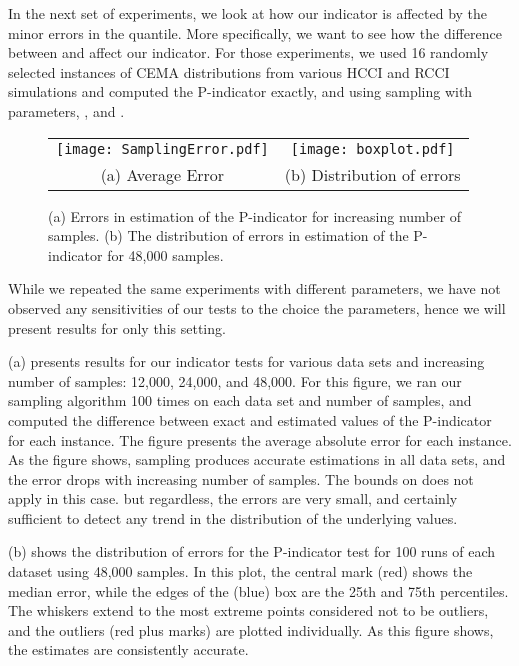 \documentclass[final]{siamltex}
\newcommand{\pmetric}{P}
\begin{document}
In the next set of experiments, we look at how our indicator is affected by the
minor errors in the quantile. More specifically, we want to see  how the
difference between  and   affect our
indicator.  
For those experiments,  we  used 16 randomly selected instances  of
CEMA  distributions from various HCCI and RCCI simulations and computed  the
\pmetric-indicator exactly, and using sampling  with parameters,  , and . 
\begin{figure}[th] \centering
   \begin{tabular}{cc}
  \hspace*{-0.08\textwidth}    
  \texttt{[image: SamplingError.pdf]}   &
  \texttt{[image: boxplot.pdf]} \\
 (a)  Average Error & (b) Distribution of errors  
\end{tabular}
\caption{(a)  Errors in  estimation of  the \pmetric-indicator for
 increasing number of samples.
(b)  The distribution of errors in  estimation of  the \pmetric-indicator  for 48,000
samples.}
   \label{fig:Boxquantiles}
\end{figure}
While we repeated the same experiments with different parameters, we have not observed any sensitivities of our tests to  the choice the parameters,  hence we will present results for only this setting.  

(a) presents results for our indicator tests for various data sets and increasing number of
samples: 12,000, 24,000, and 48,000.  For this figure, we ran our sampling
algorithm 100 times  on each data set  and number of samples, and  computed
the difference between  exact  and estimated values of the \pmetric-indicator  
for each instance.  The figure presents the average absolute error for each 
instance. As the figure shows, sampling  produces accurate estimations in all 
data sets, and the error drops with increasing number of samples. The bounds 
on  does not apply in this case. but regardless, the errors are 
very small, and certainly sufficient  to detect any trend in the distribution of the underlying values. 

(b) shows the  distribution of errors for the
\pmetric-indicator test for 100 runs of each dataset using 48,000 samples. 
In this  plot, the central mark (red) shows the median error, while the edges of the (blue) box are the 25th
and 75th percentiles. The whiskers extend to the most extreme points considered not
to be outliers, and the outliers (red plus marks) are plotted individually. As  this figure shows,  the estimates are consistently accurate. 
\end{document}
